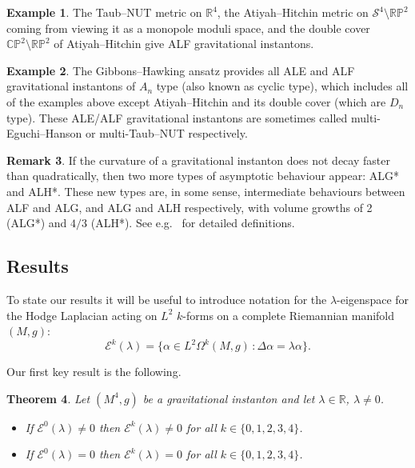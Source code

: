 \documentclass{article}
\newtheorem{thm}{Theorem}
\theoremstyle{definition}
\newtheorem{rmk}[thm]{Remark}
\newtheorem{eg}[thm]{Example}
\numberwithin{thm}{section}
\numberwithin{equation}{section}
\def\R{\mathbb{R}}
\begin{document}
\begin{eg} The Taub--NUT metric on $\R^4$, the Atiyah--Hitchin metric on $\mathcal{S}^4\setminus\mathbb{RP}^2$ coming from viewing it as a monopole moduli space, and the double cover $\mathbb{CP}^2\setminus\mathbb{RP}^2$ of Atiyah--Hitchin give ALF gravitational instantons.
\end{eg}

\begin{eg} The Gibbons--Hawking ansatz provides all ALE and ALF gravitational instantons of $A_n$ type (also known as cyclic type), which includes all of the examples above except Atiyah--Hitchin and its double cover (which are $D_n$ type). These  ALE/ALF gravitational instantons are sometimes called multi-Eguchi--Hanson or multi-Taub--NUT respectively.
\end{eg}




\begin{rmk}\label{rmk:AL*}
If the curvature of a gravitational instanton does not decay faster than quadratically, then two more types of asymptotic behaviour  appear: ALG* and ALH*. These new types are, in some sense, intermediate behaviours between ALF and ALG, and ALG and ALH respectively, with volume growths of 2 (ALG*) and $4/3$ (ALH*). See e.g.~\cite[Section 6.4]{SunZhang} for detailed definitions. 
\end{rmk}

\subsection{Results}

To state our results it will be useful to introduce notation for the  $\lambda$-eigenspace for the Hodge Laplacian acting on $L^2$ $k$-forms on a complete Riemannian manifold $(M,g)$:
\begin{equation}
    \mathcal{E}^k(\lambda)=\{\alpha\in L^2\Omega^k(M,g)\,\colon \Delta\alpha=\lambda\alpha\}.
\end{equation}

Our first key result is the following.

\begin{thm}\label{thm:grav.inst}
    Let $(M^4,g)$ be a gravitational instanton and let $\lambda\in\R$, $\lambda\neq 0$.  
    \begin{itemize}
        \item[(a)] If $\mathcal{E}^0(\lambda)\neq 0$ then $\mathcal{E}^k(\lambda)\neq 0$ for all $k\in\{0,1,2,3,4\}$.
        \item[(b)] If $\mathcal{E}^0(\lambda)=0$ then $\mathcal{E}^k(\lambda)=0$ for all $k\in\{0,1,2,3,4\}$.
    \end{itemize}
\end{thm}
\end{document}
